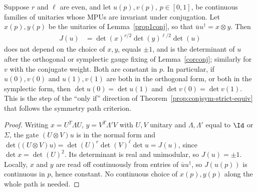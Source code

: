 \begin{lemma}
    \label{lem:mpu_conjugation_gate_path_determinants}
    \leanok
    Suppose $r$ and $\ell$ are even, and let $u(p),v(p)$, $p\in[0,1]$, be
    continuous families of unitaries whose MPUs are invariant under conjugation.
    Let $x(p),y(p)$ be the unitaries of Lemma~\ref{prop1conj}, so that
    $\overline{u}u^\dagger=x\otimes y$. Then
    \begin{align}
        J(u) & =\det(x)^{r/2}\det(y)^{\ell/2}\det(u)
    \end{align}
    does not depend on the choice of $x,y$, equals $\pm1$, and is the
    determinant of $u$ after the orthogonal or symplectic gauge fixing of
    Lemma~\ref{corconj}; similarly for $v$ with the conjugate weight. Both are
    constant in $p$. In particular, if $u(0),v(0)$ and $u(1),v(1)$ are both in
    the orthogonal form, or both in the symplectic form, then
    $\det u(0)=\det u(1)$ and $\det v(0)=\det v(1)$. This is the step of the
    ``only if'' direction of Theorem~\ref{prop:conjsym-strict-equiv} that
    follows the symmetry path criterion.
\end{lemma}

\begin{proof}
    \leanok
    Writing $x=U^T\Lambda U$, $y=V^T\Lambda'V$ with $U,V$ unitary and
    $\Lambda,\Lambda'$ equal to $\Id$ or $\Sigma$, the gate $(U\otimes V)u$ is in
    the normal form and $\det\big((U\otimes V)u\big)=\det(U)^r\det(V)^\ell\det
        u=J(u)$, since $\det x=\det(U)^2$. Its determinant is real and unimodular, so
    $J(u)=\pm1$. Locally, $x$ and $y$ are read off continuously from entries of
    $\overline uu^\dagger$, so $J(u(p))$ is continuous in $p$, hence constant.
    No continuous choice of $x(p),y(p)$ along the whole path is needed.
\end{proof}

